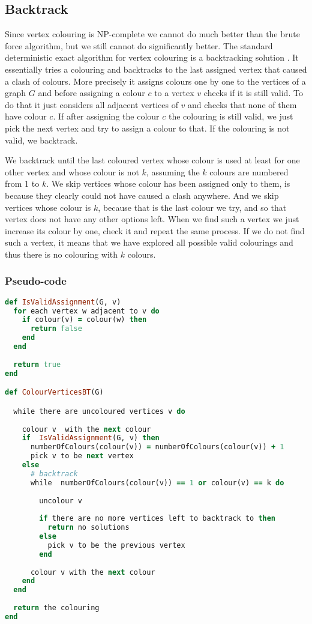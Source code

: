 \documentclass{report}
\theoremstyle{plain}
\theoremstyle{definition}
\theoremstyle{remark}
\numberwithin{definition}{chapter}
\numberwithin{example}{chapter}
\numberwithin{figure}{chapter}
\numberwithin{theorem}{chapter}
\numberwithin{lemma}{chapter}
\begin{document}
\subsection{Backtrack}

Since vertex colouring is NP-complete we cannot do much better than the brute force algorithm, but we still cannot do significantly better. The standard deterministic exact algorithm for vertex colouring is a backtracking solution \cite{skiena504algorithm}. It essentially tries a colouring and backtracks to the last assigned vertex that caused a clash of colours. More precisely it assigns colours one by one to the vertices of a graph $G$ and before assigning a colour $c$ to a vertex $v$ checks if it is still valid. To do that it just considers all adjacent vertices of $v$ and checks that none of them have colour $c$. If after assigning the colour $c$ the colouring is still valid, we just pick the next vertex and try to assign a colour to that. If the colouring is not valid, we backtrack.

We backtrack until the last coloured vertex whose colour is used at least for one other vertex and whose colour is not $k$, assuming  the $k$ colours are numbered from 1 to $k$. We skip vertices whose colour has been assigned only to them, is because they clearly could not have caused a clash anywhere. And we skip vertices whose colour is $k$, because that is the last colour we try, and so that vertex does not have any other options left. When we find such a vertex we just increase its colour by one, check it and repeat the same process. If we do not find such a vertex, it means that we have explored all possible valid colourings and thus there is no colouring with $k$ colours.

\subsubsection*{Pseudo-code}

\begin{lstlisting}[language=Ruby]
def IsValidAssignment(G, v)
  for each vertex w adjacent to v do
    if colour(v) = colour(w) then
      return false
    end
  end
        
  return true
end

def ColourVerticesBT(G)

  while there are uncoloured vertices v do
  
    colour v  with the next colour
    if  IsValidAssignment(G, v) then
      numberOfColours(colour(v)) = numberOfColours(colour(v)) + 1
      pick v to be next vertex
    else
      # backtrack
      while  numberOfColours(colour(v)) == 1 or colour(v) == k do
      
        uncolour v      
      
        if there are no more vertices left to backtrack to then
          return no solutions
        else
          pick v to be the previous vertex
        end
        
      colour v with the next colour
    end
  end    
   
  return the colouring
end
\end{lstlisting}
\end{document}
